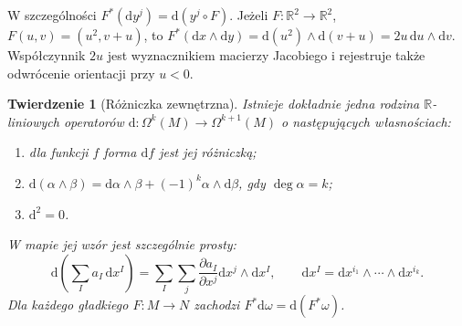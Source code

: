 \documentclass[11pt,a4paper,oneside]{report}
\newcommand{\R}{\mathbb{R}}
\newcommand{\dd}{\mathrm d}
\theoremstyle{plain}
\newtheorem{twierdzenie}{Twierdzenie}[section]
\theoremstyle{definition}
\theoremstyle{remark}
\begin{document}
W szczególności $F^*(\dd y^j)=\dd(y^j\circ F)$.
Jeżeli $F:\R^2\to\R^2$, $F(u,v)=(u^2,v+u)$,
to $F^*(\dd x\wedge\dd y)
=\dd(u^2)\wedge\dd(v+u)=2u\,\dd u\wedge\dd v$.
Współczynnik $2u$ jest wyznacznikiem macierzy Jacobiego
i rejestruje także odwrócenie orientacji przy $u<0$.

\begin{twierdzenie}[Różniczka zewnętrzna]
\label{thm:formy-d}
Istnieje dokładnie jedna rodzina $\R$-liniowych
operatorów $\dd:\Omega^k(M)\to\Omega^{k+1}(M)$
o następujących własnościach:
\begin{enumerate}[leftmargin=*]
\item dla funkcji $f$ forma $\dd f$ jest jej różniczką;
\item $\dd(\alpha\wedge\beta)=\dd\alpha\wedge\beta
 +(-1)^k\alpha\wedge\dd\beta$, gdy $\deg\alpha=k$;
\item $\dd^2=0$.
\end{enumerate}
W mapie jej wzór jest szczególnie prosty:
\begin{equation}\label{eq:zewnetrzna-lokalnie}
 \dd\!\left(\sum_I a_I\,\dd x^I\right)
  =\sum_I\sum_j\frac{\partial a_I}{\partial x^j}
     \dd x^j\wedge\dd x^I,
 \qquad \dd x^I=\dd x^{i_1}\wedge\cdots\wedge\dd x^{i_k}.
\end{equation}
Dla każdego gładkiego $F:M\to N$ zachodzi
$F^*\dd\omega=\dd(F^*\omega)$.
\end{twierdzenie}
\end{document}
